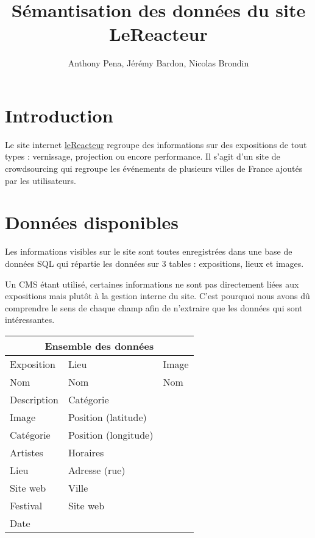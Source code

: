 \documentclass[12pt,a4paper]{article}
\title{Sémantisation des données du site LeReacteur}
\author{Anthony Pena, Jérémy Bardon, Nicolas Brondin}
\date{}
\begin{document}
	\renewcommand{\contentsname}{Sommaire}

	\maketitle

	\newpage
	\tableofcontents
	\newpage
	
	\section{Introduction}
	Le site internet \href{http://lereacteur.info}{leReacteur} regroupe des informations sur des expositions de tout types : vernissage, projection ou encore performance. Il s'agit d'un site de crowdsourcing qui regroupe les événements de plusieurs villes de France ajoutés par les utilisateurs.
	
	\section{Données disponibles}	
	Les informations visibles sur le site sont toutes enregistrées dans une base de données SQL qui répartie les données sur 3 tables : expositions, lieux et images. 
	
	Un CMS étant utilisé, certaines informations ne sont pas directement liées aux expositions mais plutôt à la gestion interne du site. C'est pourquoi nous avons dû comprendre le sens de chaque champ afin de n'extraire que les données qui sont intéressantes.
	
	\begin{center}
	\begin{tabular}{|l|l|l|}
		\hline
		\multicolumn{3}{|c|}{Ensemble des données} \\
		\hline
		Exposition & Lieu & Image \\
		\hline
		Nom & Nom & Nom \\
		Description & Catégorie &\\
		Image & Position (latitude) &\\
		Catégorie & Position (longitude) &\\
		Artistes & Horaires &\\
		Lieu & Adresse (rue) &\\
		Site web & Ville &\\
		Festival & Site web &\\
		Date &&\\    		
		\hline
	\end{tabular}
	\end{center}
	
\end{document}
